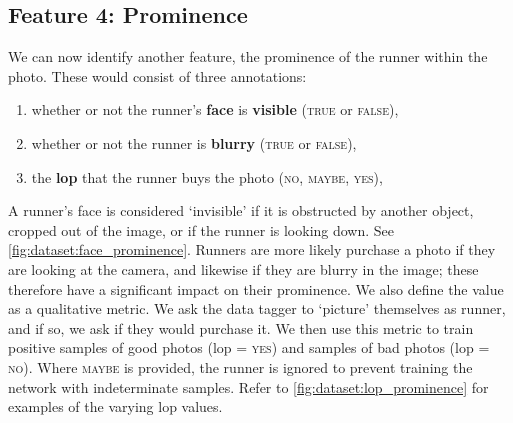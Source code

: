 %

\subsection{Feature 4: Prominence}

We can now identify another feature, the prominence of the runner within the photo. These would consist of three annotations:

\begin{enumerate}
  \item whether or not the runner's \textbf{face} is \textbf{visible} (\textsc{true} or \textsc{false}),
  \item whether or not the runner is \textbf{blurry} (\textsc{true} or \textsc{false}),
  \item the \textbf{\gls{lop}} that the runner buys the photo (\textsc{no}, \textsc{maybe}, \textsc{yes}),
\end{enumerate}

A runner's face is considered `invisible' if it is obstructed by another object, cropped out of the image, or if the runner is looking down. See \cref{fig:dataset:face_prominence}. Runners are more likely purchase a photo if they are looking at the camera, and likewise if they are blurry in the image; these therefore have a significant impact on their prominence. We also define the  value as a qualitative metric. We ask the data tagger to `picture' themselves as runner, and if so, we ask if they would purchase it. We then use this metric to train positive samples of good photos (\gls{lop} = \textsc{yes}) and samples of bad photos (\gls{lop} = \textsc{no}). Where \textsc{maybe} is provided, the runner is ignored to prevent training the network with indeterminate samples. Refer to \cref{fig:dataset:lop_prominence} for examples of the varying \gls{lop} values. 

